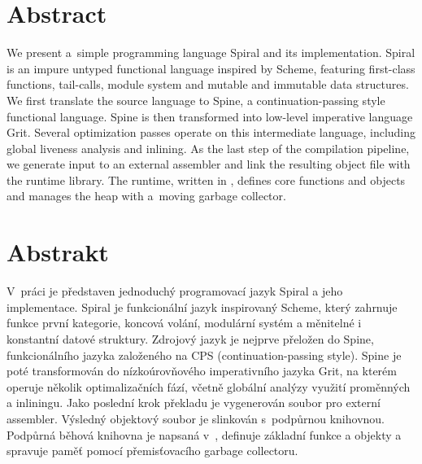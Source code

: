 \begin{adjustwidth}{1.5cm}{1.5cm}

\section*{Abstract}

We present a~simple programming language Spiral and its implementation. Spiral
is an impure untyped functional language inspired by Scheme, featuring
first-class functions, tail-calls, module system and mutable and immutable data
structures. We first translate the source language to Spine, a
continuation-passing style functional language. Spine is then transformed into
low-level imperative language Grit. Several optimization passes operate on this
intermediate language, including global liveness analysis and inlining. As the
last step of the compilation pipeline, we generate input to an external
assembler and link the resulting object file with the runtime library. The
runtime, written in \Cplusplus, defines core functions and objects and manages
the heap with a~moving garbage collector.

\section*{Abstrakt}

V~práci je představen jednoduchý programovací jazyk Spiral a jeho implementace.
Spiral je funkcionální jazyk inspirovaný Scheme, který zahrnuje funkce první
kategorie, koncová volání, modulární systém a měnitelné i konstantní datové
struktury. Zdrojový jazyk je nejprve přeložen do Spine, funkcionálního jazyka
založeného na CPS (continuation-passing style). Spine je poté transformován do
nízkoúrovňového imperativního jazyka Grit, na kterém operuje několik
optimalizačních fází, včetně globální analýzy využití proměnných a inliningu.
Jako poslední krok překladu je vygenerován soubor pro externí assembler.
Výsledný objektový soubor je slinkován s~podpůrnou knihovnou. Podpůrná běhová
knihovna je napsaná v~\Cplusplus, definuje základní funkce a objekty a spravuje
paměť pomocí přemisťovacího garbage collectoru.

\end{adjustwidth}

\newpage
